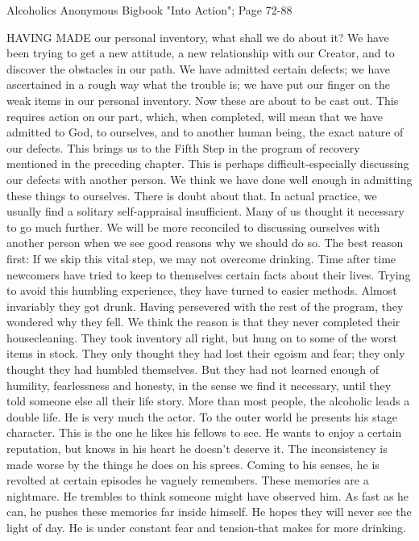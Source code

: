 
Alcoholics Anonymous Bigbook "Into Action"; Page 72-88

\begin{biblechapter}

HAVING MADE our personal inventory, what shall we do about it?  We have been trying to get a new attitude, a new relationship with our Creator, and to discover the obstacles in our path.  We have admitted certain defects; we have ascertained in a rough way what the trouble is; we have put our finger on the weak items in our personal inventory.  Now these are about to be cast out.  This requires action on our part, which, when completed, will mean that we have admitted to God, to ourselves, and to another human being, the exact nature of our defects.  This brings us to the Fifth Step in the program of recovery mentioned in the preceding chapter.
This is perhaps difficult-especially discussing our defects with another person.  We think we have done well enough in admitting these things to ourselves.  There is doubt about that.  In actual practice, we usually find a solitary self-appraisal insufficient.  Many of us thought it necessary to go much further.  We will be more reconciled to discussing ourselves with another person when we see good reasons why we should do so.  The best reason first: If we skip this vital step, we may not overcome drinking.  Time after time newcomers have tried to keep to themselves certain facts about their lives.  Trying to avoid this humbling experience, they have turned to easier methods.  Almost invariably they got drunk.  Having persevered with the rest of the program, they wondered why they fell.  We think the reason is that they never completed their housecleaning.  They took inventory all right, but hung on to some of the worst items in stock.  They only thought they had lost their egoism and fear; they only thought they had humbled themselves.  But they had not learned enough of humility, fearlessness and honesty, in the sense we find it necessary, until they told someone else all their life story.
More than most people, the alcoholic leads a double life.  He is very much the actor.  To the outer world he presents his stage character.  This is the one he likes his fellows to see.  He wants to enjoy a certain reputation, but knows in his heart he doesn't deserve it.
The inconsistency is made worse by the things he does on his sprees.  Coming to his senses, he is revolted at certain episodes he vaguely remembers.  These memories are a nightmare.  He trembles to think someone might have observed him.  As fast as he can, he pushes these memories far inside himself.  He hopes they will never see the light of day.  He is under constant fear and tension-that makes for more drinking.

\end{biblechapter}
